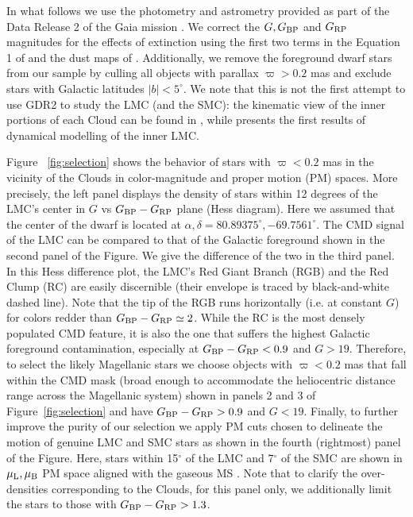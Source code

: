 \documentclass[a4paper,useAMS,usenatbib]{mnras}
\begin{document}
In what follows we use the photometry and astrometry provided as part
of the Data Release 2 \citep[][]{Brown2018} of the Gaia mission
\citep[][]{Prusti2016}. We correct the $G, G_{\rm BP}$ and $G_{\rm
  RP}$ magnitudes for the effects of extinction using the first two
terms in the Equation 1 of \citet{Babusiaux2018} and the dust maps of
\citet{SFD}. Additionally, we remove the foreground dwarf stars from
our sample by culling all objects with parallax $\varpi>0.2$ mas and
exclude stars with Galactic latitudes $|b|<5^{\circ}$. We note that
this is not the first attempt to use GDR2 to study the LMC (and the
SMC): the kinematic view of the inner portions of each Cloud can be
found in \citet{Helmi2018}, while \citet{Vasiliev2018} presents the
first results of dynamical modelling of the inner LMC.

Figure ~\ref{fig:selection} shows the behavior of stars with
$\varpi<0.2$ mas in the vicinity of the Clouds in color-magnitude and
proper motion (PM) spaces. More precisely, the left panel displays the
density of stars within 12 degrees of the LMC's center in $G$ vs
$G_{\rm BP}-G_{\rm RP}$ plane (Hess diagram). Here we assumed that the
center of the dwarf is located at $\alpha, \delta =
80.89375^{\circ},-69.7561^{\circ}$. The CMD signal of the LMC can be
compared to that of the Galactic foreground shown in the second panel
of the Figure. We give the difference of the two in the third
panel. In this Hess difference plot, the LMC's Red Giant Branch (RGB)
and the Red Clump (RC) are easily discernible (their envelope is
traced by black-and-white dashed line). Note that the tip of the RGB
runs horizontally (i.e. at constant $G$) for colors redder than
$G_{\rm BP}-G_{\rm RP} \simeq 2$. While the RC is the most densely
populated CMD feature, it is also the one that suffers the highest
Galactic foreground contamination, especially at $G_{\rm BP}-G_{\rm
  RP}<0.9$ and $G>19$. Therefore, to select the likely Magellanic
stars we choose objects with $\varpi<0.2$ mas that fall within the CMD
mask (broad enough to accommodate the heliocentric distance range
across the Magellanic system) shown in panels 2 and 3 of
Figure~\ref{fig:selection} and have $G_{\rm BP}-G_{\rm RP}>0.9$ and
$G<19$. Finally, to further improve the purity of our selection we
apply PM cuts chosen to delineate the motion of genuine LMC
and SMC stars as shown in the fourth (rightmost) panel of the
Figure. Here, stars within 15$^{\circ}$ of the LMC and 7$^{\circ}$ of
the SMC are shown in $\mu_{\rm L}, \mu_{\rm B}$ PM space
aligned with the gaseous MS \citep[see][for the definition of the
  $L_{\rm MS}, B_{\rm MS}$ coordinate system]{Nidever2008}. Note that
to clarify the over-densities corresponding to the Clouds, for this
panel only, we additionally limit the stars to those with $G_{\rm
  BP}-G_{\rm RP}>1.3$.
\end{document}
